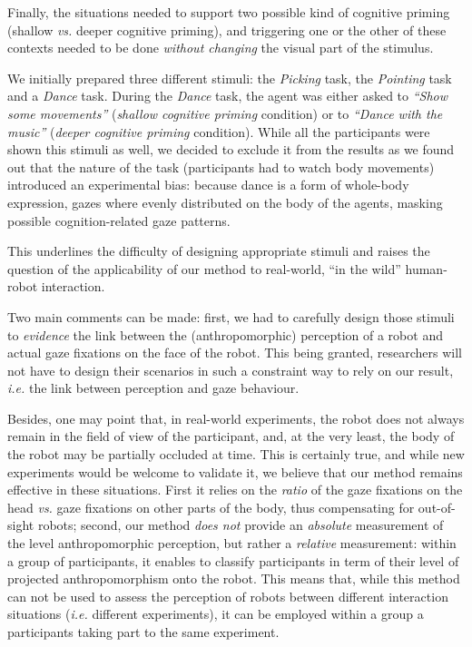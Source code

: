 \documentclass[lettersize, noapacite, twoside, HRI]{apa_HRI}
\newcommand{\ie}{\textit{i.e.}\xspace}
\newcommand{\vs}{\textit{vs.}\xspace}
\begin{document}
Finally, the situations needed to support two possible kind of cognitive priming
(shallow \vs deeper cognitive priming), and triggering one or the other of these
contexts needed to be done \emph{without changing} the visual part of the
stimulus.

We initially prepared three different stimuli: the \emph{Picking} task, the
\emph{Pointing} task and a \emph{Dance} task.  During the \emph{Dance} task, the
agent was either asked to \emph{``Show some movements''} (\emph{shallow
cognitive priming} condition) or to \emph{``Dance with the music''}
(\emph{deeper cognitive priming} condition). While all the participants were
shown this stimuli as well, we decided to exclude it from the results as we
found out that the nature of the task (participants had to watch body movements)
introduced an experimental bias: because dance is a form of whole-body
expression, gazes where evenly distributed on the body of the agents, masking
possible cognition-related gaze patterns.

This underlines the difficulty of designing appropriate stimuli and raises the
question of the applicability of our method to real-world, ``in the wild''
human-robot interaction.

Two main comments can be made: first, we had to carefully design those stimuli
to \emph{evidence} the link between the (anthropomorphic) perception of a robot
and actual gaze fixations on the face of the robot. This being granted,
researchers will not have to design their scenarios in such a constraint way to
rely on our result, \ie the link between perception and gaze behaviour.

Besides, one may point that, in real-world experiments, the robot does not
always remain in the field of view of the participant, and, at the very least, the
body of the robot may be partially occluded at time.  This is certainly true,
and while new experiments would be welcome to validate it, we believe that our
method remains effective in these situations. First it relies on the
\emph{ratio} of the gaze fixations on the head \vs gaze fixations on other parts
of the body, thus compensating for out-of-sight robots; second, our method
\emph{does not} provide an \emph{absolute} measurement of the level
anthropomorphic perception, but rather a \emph{relative} measurement: within a
group of participants, it enables to classify participants in term of their level of
projected anthropomorphism onto the robot.  This means that, while this method
can not be used to assess the perception of robots between different interaction
situations (\ie different experiments), it can be employed within a group a
participants taking part to the same experiment.
\end{document}
